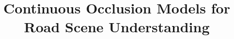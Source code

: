 \documentclass[10pt,twocolumn,letterpaper]{article}
\begin{document}
\title{Continuous Occlusion Models for Road Scene Understanding}


\maketitle



















{\small


}
\end{document}
